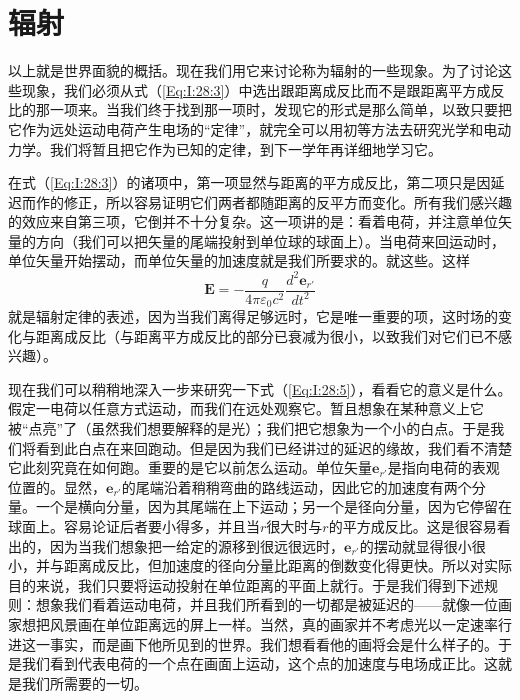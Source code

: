 \section{辐射}

以上就是世界面貌的概括。现在我们用它来讨论称为辐射的一些现象。为了讨论这些现象，我们必须从式（\ref{Eq:I:28:3}）中选出跟距离成反比而不是跟距离平方成反比的那一项来。当我们终于找到那一项时，发现它的形式是那么简单，以致只要把它作为远处运动电荷产生电场的“定律”，就完全可以用初等方法去研究光学和电动力学。我们将暂且把它作为已知的定律，到下一学年再详细地学习它。

在式（\ref{Eq:I:28:3}）的诸项中，第一项显然与距离的平方成反比，第二项只是因延迟而作的修正，所以容易证明它们两者都随距离的反平方而变化。所有我们感兴趣的效应来自第三项，它倒并不十分复杂。这一项讲的是：看着电荷，并注意单位矢量的方向（我们可以把矢量的尾端投射到单位球的球面上）。当电荷来回运动时，单位矢量开始摆动，而单位矢量的加速度就是我们所要求的。就这些。这样
\begin{equation}
    \label{Eq:I:28:5}
    \boldsymbol{E} = -\frac{q}{4\pi\varepsilon_0c^2} \frac{d^2\boldsymbol{e}_{r'}}{dt^2}
\end{equation}
就是辐射定律的表述，因为当我们离得足够远时，它是唯一重要的项，这时场的变化与距离成反比（与距离平方成反比的部分已衰减为很小，以致我们对它们已不感兴趣）。

现在我们可以稍稍地深入一步来研究一下式（\ref{Eq:I:28:5}），看看它的意义是什么。假定一电荷以任意方式运动，而我们在远处观察它。暂且想象在某种意义上它被“点亮”了（虽然我们想要解释的是光）；我们把它想象为一个小的白点。于是我们将看到此白点在来回跑动。但是因为我们已经讲过的延迟的缘故，我们看不清楚它此刻究竟在如何跑。重要的是它以前怎么运动。单位矢量$\boldsymbol{e}_{r'}$是指向电荷的表观位置的。显然，$\boldsymbol{e}_{r'}$的尾端沿着稍稍弯曲的路线运动，因此它的加速度有两个分量。一个是横向分量，因为其尾端在上下运动；另一个是径向分量，因为它停留在球面上。容易论证后者要小得多，并且当$r$很大时与$r$的平方成反比。这是很容易看出的，因为当我们想象把一给定的源移到很远很远时，$\boldsymbol{e}_{r'}$的摆动就显得很小很小，并与距离成反比，但加速度的径向分量比距离的倒数变化得更快。所以对实际目的来说，我们只要将运动投射在单位距离的平面上就行。于是我们得到下述规则：想象我们看着运动电荷，并且我们所看到的一切都是被延迟的——就像一位画家想把风景画在单位距离远的屏上一样。当然，真的画家并不考虑光以一定速率行进这一事实，而是画下他所见到的世界。我们想看看他的画将会是什么样子的。于是我们看到代表电荷的一个点在画面上运动，这个点的加速度与电场成正比。这就是我们所需要的一切。

